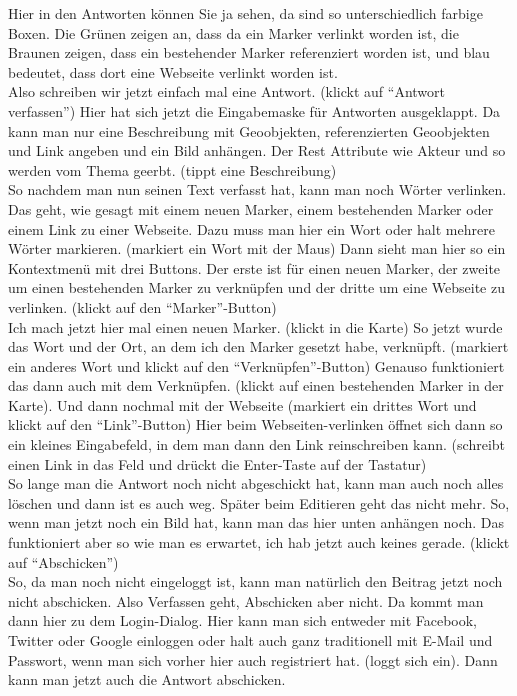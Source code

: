 \begin{itemize}
Hier in den Antworten k{\"o}nnen Sie ja sehen, da sind so unterschiedlich farbige Boxen. Die Gr{\"u}nen zeigen an, dass da ein Marker verlinkt worden ist, die Braunen zeigen, dass ein bestehender Marker referenziert worden ist, und blau bedeutet, dass dort eine Webseite verlinkt worden ist.\\
Also schreiben wir jetzt einfach mal eine Antwort. (klickt auf "`Antwort verfassen"') Hier hat sich jetzt die Eingabemaske f{\"u}r Antworten ausgeklappt. Da kann man nur eine Beschreibung mit Geoobjekten, referenzierten Geoobjekten und Link angeben und ein Bild anh{\"a}ngen. Der Rest Attribute wie Akteur und so werden vom Thema geerbt. (tippt eine Beschreibung)\\
So nachdem man nun seinen Text verfasst hat, kann man noch W{\"o}rter verlinken. Das geht, wie gesagt mit einem neuen Marker, einem bestehenden Marker oder einem Link zu einer Webseite. Dazu muss man hier ein Wort oder halt mehrere W{\"o}rter markieren. (markiert ein Wort mit der Maus) Dann sieht man hier so ein Kontextmen{\"u} mit drei Buttons. Der erste ist f{\"u}r einen neuen Marker, der zweite um einen bestehenden Marker zu verkn{\"u}pfen und der dritte um eine Webseite zu verlinken. (klickt auf den "`Marker"'-Button)\\
Ich mach jetzt hier mal einen neuen Marker. (klickt in die Karte) So jetzt wurde das Wort und der Ort, an dem ich den Marker gesetzt habe, verkn{\"u}pft. (markiert ein anderes Wort und klickt auf den "`Verkn{\"u}pfen"'-Button) Genauso funktioniert das dann auch mit dem Verkn{\"u}pfen. (klickt auf einen bestehenden Marker in der Karte). Und dann nochmal mit der Webseite (markiert ein drittes Wort und klickt auf den "`Link"'-Button) Hier beim Webseiten-verlinken {\"o}ffnet sich dann so ein kleines Eingabefeld, in dem man dann den Link reinschreiben kann. (schreibt einen Link in das Feld und dr{\"u}ckt die Enter-Taste auf der Tastatur)\\
So lange man die Antwort noch nicht abgeschickt hat, kann man auch noch alles l{\"o}schen und dann ist es auch weg. Sp{\"a}ter beim Editieren geht das nicht mehr. So, wenn man jetzt noch ein Bild hat, kann man das hier unten anh{\"a}ngen noch. Das funktioniert aber so wie man es erwartet, ich hab jetzt auch keines gerade. (klickt auf "`Abschicken"')\\
So, da man noch nicht eingeloggt ist, kann man nat{\"u}rlich den Beitrag jetzt noch nicht abschicken. Also Verfassen geht, Abschicken aber nicht. Da kommt man dann hier zu dem Login-Dialog. Hier kann man sich entweder mit Facebook, Twitter oder Google einloggen oder halt auch ganz traditionell mit E-Mail und Passwort, wenn man sich vorher hier auch registriert hat. (loggt sich ein). Dann kann man jetzt auch die Antwort abschicken.\\

\end{itemize}
